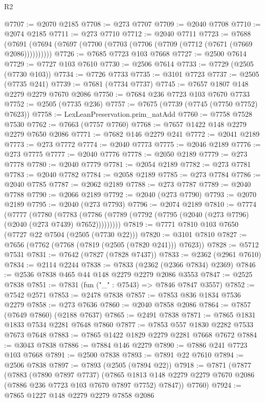 \begin{lexlean}{R2}
\begin{coremodule}
@7707 := @2070 @2185
@7708 := @273 @7707
@7709 := @2040 @7708
@7710 := @2074 @2185
@7711 := @273 @7710
@7712 := @2040 @7711
@7723 := @7688 (@7691 (@7694 (@7697 (@7700 (@7703 (@7706 (@7709 (@7712 (@7671 (@7669 @2086))))))))))
@7726 := @7685 @7723 @103 @7668
@7727 := @2500 @7614
@7729 := @7727 @103 @7610
@7730 := @2506 @7614
@7733 := @7729 (@2505 (@7730 @103))
@7734 := @7726 @7733
@7735 := @3101 @7723
@7737 := @2505 (@7735 @241)
@7739 := @7681 (@7734 @7737)
@7745 := @7657 @1807 @148 @2279 @2279 @7670 @2086
@7750 := @7684 @236 @7723 @103 @7670 @7733
@7752 := @2505 (@7735 @236)
@7757 := @7675 (@7739 (@7745 (@7750 @7752) @7623))
@7758 := LexLeanPreservation.prim_natAdd
@7760 := @7758 @7528 @7530
@7762 := @7663 (@7757 @7760)
@7768 := @7657 @1422 @148 @2279 @2279 @7650 @2086
@7771 := @7682 @146 @2279 @241
@7772 := @2041 @2189
@7773 := @273 @7772
@7774 := @2040 @7773
@7775 := @2046 @2189
@7776 := @273 @7775
@7777 := @2040 @7776
@7778 := @2050 @2189
@7779 := @273 @7778
@7780 := @2040 @7779
@7781 := @2054 @2189
@7782 := @273 @7781
@7783 := @2040 @7782
@7784 := @2058 @2189
@7785 := @273 @7784
@7786 := @2040 @7785
@7787 := @2062 @2189
@7788 := @273 @7787
@7789 := @2040 @7788
@7790 := @2066 @2189
@7792 := @2040 (@273 @7790)
@7793 := @2070 @2189
@7795 := @2040 (@273 @7793)
@7796 := @2074 @2189
@7810 := @7774
    (@7777
      (@7780
        (@7783 (@7786 (@7789 (@7792 (@7795 (@2040 (@273 @7796) (@2040 (@273 @7439) @7652)))))))))
@7819 := @7771 @7810 @103 @7650 (@7727 @22 @7504 (@2505 (@7730 @22)))
@7820 := @3101 @7810
@7827 := @7656 (@7762 (@7768 (@7819 (@2505 (@7820 @241))) @7623))
@7828 := @5712 @7531
@7831 := @7642 (@7827 (@7828 @7437))
@7833 := @2362 (@2961 @7610)
@7834 := @2114 @2244
@7838 := @7833 (@2362 (@2366 @7834) @2369)
@7846 := @2536 @7838 @465 @44 @148 @2279 @2279 @2086 @3553
@7847 := @2525 @7838
@7851 := @7831 (fun ("_" : @7543) => @7846 @7847 @3557)
@7852 := @7542 @2571
@7853 := @2478 @7838
@7857 := @7853 @836 @1834 @7536 @2279
@7858 := @273 @7636
@7860 := @2040 @7858 @2086
@7864 := @7857 (@7649 @7860) (@2188 @7637)
@7865 := @2491 @7838
@7871 := @7865 @1831 @1833 @7534 @2281 @7648 @7860
@7877 := @7853 @557 @1830 @2282 @7533 @7673 @7648
@7883 := @7865 @1422 @1829 @2279 @2281 @7668 @7672
@7884 := @3043 @7838
@7886 := @7884 @146 @2279
@7890 := @7886 @241 @7723 @103 @7668
@7891 := @2500 @7838
@7893 := @7891 @22 @7610
@7894 := @2506 @7838
@7897 := @7893 (@2505 (@7894 @22))
@7918 := @7871
    (@7877
      (@7883
        (@7890 @7897 @7737)
        (@7865 @1813 @148 @2279 @2279 @7670 @2086 (@7886 @236 @7723 @103 @7670 @7897 @7752) @7847))
      @7760)
@7924 := @7865 @1227 @148 @2279 @2279 @7858 @2086

\end{coremodule}
\end{lexlean}
